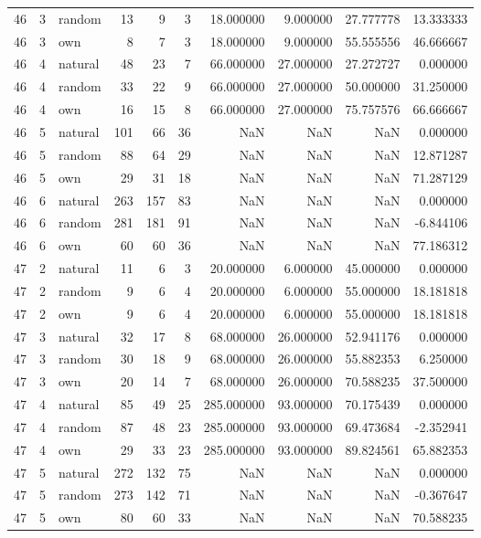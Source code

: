 \begin{table}[htbp]
\begin{tabular}{rrlrrrrrrr}
46 & 3 & random & 13 & 9 & 3 & 18.000000 & 9.000000 & 27.777778 & 13.333333 \\
46 & 3 & own & 8 & 7 & 3 & 18.000000 & 9.000000 & 55.555556 & 46.666667 \\
46 & 4 & natural & 48 & 23 & 7 & 66.000000 & 27.000000 & 27.272727 & 0.000000 \\
46 & 4 & random & 33 & 22 & 9 & 66.000000 & 27.000000 & 50.000000 & 31.250000 \\
46 & 4 & own & 16 & 15 & 8 & 66.000000 & 27.000000 & 75.757576 & 66.666667 \\
46 & 5 & natural & 101 & 66 & 36 & NaN & NaN & NaN & 0.000000 \\
46 & 5 & random & 88 & 64 & 29 & NaN & NaN & NaN & 12.871287 \\
46 & 5 & own & 29 & 31 & 18 & NaN & NaN & NaN & 71.287129 \\
46 & 6 & natural & 263 & 157 & 83 & NaN & NaN & NaN & 0.000000 \\
46 & 6 & random & 281 & 181 & 91 & NaN & NaN & NaN & -6.844106 \\
46 & 6 & own & 60 & 60 & 36 & NaN & NaN & NaN & 77.186312 \\
47 & 2 & natural & 11 & 6 & 3 & 20.000000 & 6.000000 & 45.000000 & 0.000000 \\
47 & 2 & random & 9 & 6 & 4 & 20.000000 & 6.000000 & 55.000000 & 18.181818 \\
47 & 2 & own & 9 & 6 & 4 & 20.000000 & 6.000000 & 55.000000 & 18.181818 \\
47 & 3 & natural & 32 & 17 & 8 & 68.000000 & 26.000000 & 52.941176 & 0.000000 \\
47 & 3 & random & 30 & 18 & 9 & 68.000000 & 26.000000 & 55.882353 & 6.250000 \\
47 & 3 & own & 20 & 14 & 7 & 68.000000 & 26.000000 & 70.588235 & 37.500000 \\
47 & 4 & natural & 85 & 49 & 25 & 285.000000 & 93.000000 & 70.175439 & 0.000000 \\
47 & 4 & random & 87 & 48 & 23 & 285.000000 & 93.000000 & 69.473684 & -2.352941 \\
47 & 4 & own & 29 & 33 & 23 & 285.000000 & 93.000000 & 89.824561 & 65.882353 \\
47 & 5 & natural & 272 & 132 & 75 & NaN & NaN & NaN & 0.000000 \\
47 & 5 & random & 273 & 142 & 71 & NaN & NaN & NaN & -0.367647 \\
47 & 5 & own & 80 & 60 & 33 & NaN & NaN & NaN & 70.588235 \\

\end{tabular}
\end{table}
